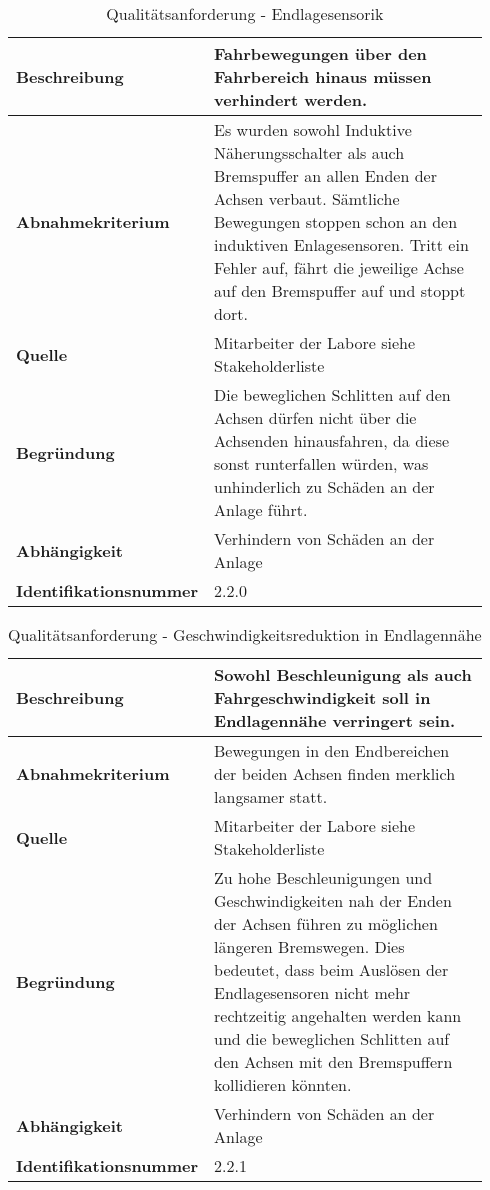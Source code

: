 \documentclass[../Bachelorarbeit.tex]{subfiles}
\begin{document}
\begin{table}[H]
    \centering
    \begin{tabular}{| p{0.34\linewidth} | p{0.6\linewidth} |}
        \hline
        \textbf{Beschreibung} & Fahrbewegungen über den Fahrbereich hinaus müssen verhindert werden. \\ \hline
        \textbf{Abnahmekriterium} & Es wurden sowohl Induktive Näherungsschalter als auch Bremspuffer an allen Enden der Achsen verbaut. Sämtliche Bewegungen stoppen schon an den induktiven Enlagesensoren. Tritt ein Fehler auf, fährt die jeweilige Achse auf den Bremspuffer auf und stoppt dort. \\ \hline
        \textbf{Quelle} & Mitarbeiter der Labore siehe Stakeholderliste \\ \hline
        \textbf{Begründung} & Die beweglichen Schlitten auf den Achsen dürfen nicht über die Achsenden hinausfahren, da diese sonst runterfallen würden, was unhinderlich zu Schäden an der Anlage führt. \\ \hline
        \textbf{Abhängigkeit} & Verhindern von Schäden an der Anlage \\ \hline
        \textbf{Identifikationsnummer} & 2.2.0 \\ \hline
    \end{tabular}
    \caption[\acs{nfa} - Endlagesensorik]{Qualitätsanforderung - Endlagesensorik}
    \label{tab:my-table20}
\end{table}

\begin{table}[H]
    \centering
    \begin{tabular}{| p{0.34\linewidth} | p{0.6\linewidth} |}
        \hline
        \textbf{Beschreibung} & Sowohl Beschleunigung als auch Fahrgeschwindigkeit soll in Endlagennähe verringert sein. \\ \hline
        \textbf{Abnahmekriterium} & Bewegungen in den Endbereichen der beiden Achsen finden merklich langsamer statt. \\ \hline
        \textbf{Quelle} & Mitarbeiter der Labore siehe Stakeholderliste \\ \hline
        \textbf{Begründung} & Zu hohe Beschleunigungen und Geschwindigkeiten nah der Enden der Achsen führen zu möglichen längeren Bremswegen. Dies bedeutet, dass beim Auslösen der Endlagesensoren nicht mehr rechtzeitig angehalten werden kann und die beweglichen Schlitten auf den Achsen mit den Bremspuffern kollidieren könnten. \\ \hline
        \textbf{Abhängigkeit} & Verhindern von Schäden an der Anlage \\ \hline
        \textbf{Identifikationsnummer} & 2.2.1 \\ \hline
    \end{tabular}
    \caption[\acs{nfa} - Geschwindigkeitsreduktion in Endlagennähe]{Qualitätsanforderung - Geschwindigkeitsreduktion in Endlagennähe}
    \label{tab:my-table21}
\end{table}
\end{document}
